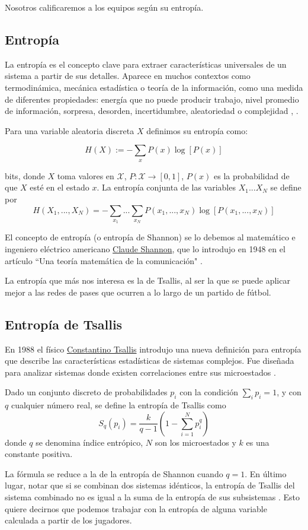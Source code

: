 Nosotros calificaremos a los equipos según su entropía.

\subsection{Entropía}
La entropía es el concepto clave para extraer características universales de un sistema a partir de sus 
detalles. Aparece en muchos contextos como termodinámica, mecánica estadística o teoría de la información, como 
una medida de diferentes propiedades: energía que no puede producir trabajo, nivel promedio de información, sorpresa, 
desorden, incertidumbre, aleatoriedad o complejidad \cite{gen-entr-review}, \cite{t-entropy}.

\begin{definicion}[Entropía] \label{def:entropy}
Para una variable aleatoria discreta $X$ definimos su entropía como:  

$$H(X):= - \sum_{x} P(x)\log[P(x)]$$

bits, donde $X$ toma valores en $\mathcal{X}$, $P:\mathcal{X} \rightarrow [0,1]$, $P(x)$ es la 
probabilidad de que $X$ esté en el estado $x$. La 
entropía conjunta de las variables $X_1...X_N$ se define por 
$$H(X_1,...,X_N)=-\sum_{x_1}...\sum_{x_N}P(x_1,...,x_N)\log[P(x_1,...,x_N)]$$
\end{definicion}

El concepto de entropía (o entropía de Shannon) se lo debemos al matemático e ingeniero eléctrico americano 
\href{https://en.wikipedia.org/wiki/Claude_Shannon}{Claude Shannon}, que lo introdujo en 1948 en el 
artículo ``Una teoría matemática de la comunicación" \cite{shannon-1948}.

La entropía que más nos interesa es la de Tsallis, al ser la que se puede aplicar mejor a las redes de pases 
que ocurren a lo largo de un partido de fútbol.

\subsection{Entropía de Tsallis}
En 1988 el físico \href{https://en.wikipedia.org/wiki/Constantino_Tsallis}{Constantino Tsallis} 
introdujo una nueva definición para entropía que describe las características estadísticas de sistemas 
complejos. Fue diseñada para analizar sistemas donde existen correlaciones entre sus microestados \cite{tsallis}.
\begin{definicion} \label{def:tsallis_entropy}
Dado un conjunto discreto de probabilidades ${p_i}$ con la condición $\sum_{i} p_i = 1$, y con $q$ 
cualquier número real, se define la entropía de Tsallis como
$$ S_q(p_i)=\frac{k}{q-1}\left(1- \sum_{i=1}^{N}p_{i}^{q}\right)$$
donde $q$ se denomina índice entrópico, $N$ son los microestados y $k$ es una constante positiva.
\end{definicion}

La fórmula se reduce a la de la entropía de Shannon cuando $q=1$. En último lugar, notar que si se 
combinan dos sistemas idénticos, 
la entropía de Tsallis del sistema combinado no es igual a la suma de la entropía de sus 
subsistemas \cite{comparison-entropies}. Esto quiere decirnos que podemos trabajar con la entropía de 
alguna variable calculada a partir de los jugadores.
